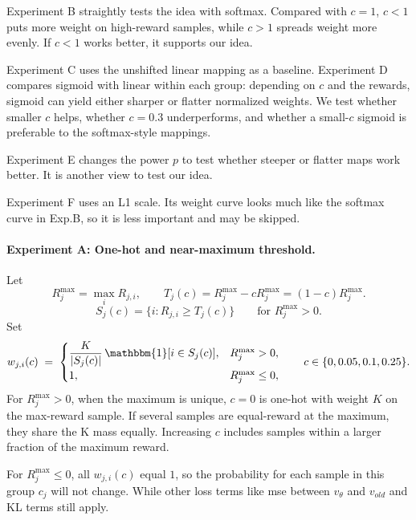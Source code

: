 \documentclass{article} %
\begin{document}
Experiment B straightly tests the idea with softmax. Compared with \(c=1\),
\(c<1\) puts more weight on high-reward samples, while \(c>1\) spreads weight
more evenly. If \(c<1\) works better, it supports our idea.

Experiment C uses the unshifted linear mapping as a baseline. Experiment D
compares sigmoid with linear within each group: depending on \(c\) and the
rewards, sigmoid can yield either sharper or flatter normalized weights.
We test whether smaller \(c\) helps, whether \(c=0.3\) underperforms, and
whether a small-\(c\) sigmoid is preferable to the softmax-style mappings.

Experiment E changes the power \(p\) to
test whether steeper or flatter maps work better. It is another view to test our idea.

Experiment F uses an L1
scale. Its weight curve looks much like the softmax curve in Exp.B, so it is
less important and may be skipped.



\paragraph{Experiment A: One-hot and near-maximum threshold.}

Let
\[
R_j^{\max}=\max_i R_{j,i},\qquad
T_j(c)=R_j^{\max}-cR_j^{\max}=(1-c)R_j^{\max}.
\]
\[
S_j(c)=\{i:R_{j,i}\ge T_j(c)\}\qquad\text{for }R_j^{\max}>0.
\]
Set
\[
w_{j,i}(c)
\;=\;
\begin{cases}
\displaystyle\frac{K}{|S_j(c)|}\,\mathbbm{1}[i\in S_j(c)],
& R_j^{\max}>0,\\[6pt]
1, & R_j^{\max}\le0,
\end{cases}
\qquad c\in\{0,0.05,0.1,0.25\}.
\]
For \(R_j^{\max}>0\), when the maximum is unique, \(c=0\) is one-hot with weight \(K\) on the
max-reward sample. If several samples are equal-reward at the maximum, they share the
K mass equally. Increasing \(c\) includes samples
within a larger fraction of the maximum reward. 

For \(R_j^{\max}\le0\),
all $w_{j,i}(c)$ equal \(1\), so the probability for each sample in this group $c_j$ will not change. While other loss terms like mse between $v_{\theta}$ and $v_{old}$ and KL terms still apply.
\end{document}
